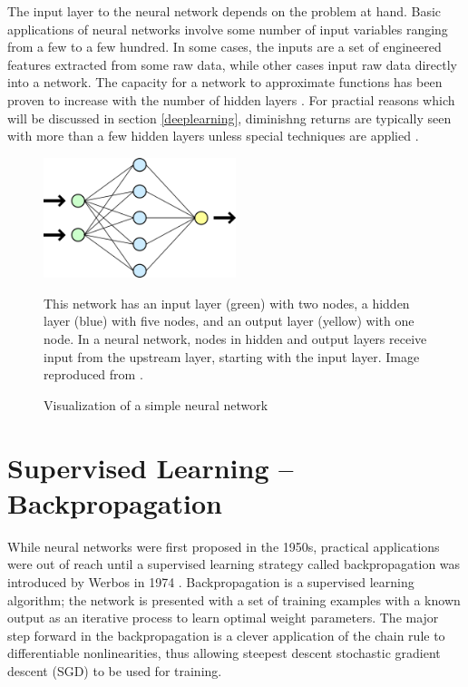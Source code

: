 The input layer to the neural network depends on the problem at hand.  Basic applications of neural networks involve some number of input variables ranging from a few to a few hundred.  In some cases, the inputs are a set of engineered features extracted from some raw data, while other cases input raw data directly into a network.  The capacity for a network to approximate functions
has been proven to increase with the number of hidden
layers \cite{reed1999neural,lecun2015deep}.
For practial reasons which will be discussed in section \ref{deeplearning},
diminishng returns are typically seen with more than a few hidden layers unless
special techniques are applied \cite{rein1981neutrino,lecun2015deep}.


\begin{figure}
  \begin{center}
    \includegraphics[width=0.5\textwidth]{figures/figures/basicNN.png}
  \end{center}
  \caption{Visualization of a simple neural network}{This network has an input
  layer (green) with two nodes, a hidden layer (blue) with five nodes, and an
  output layer (yellow) with one node.
  In a neural network, nodes in hidden and output layers receive input from the
  upstream layer, starting with the input layer.
  Image reproduced from \cite{nnetWikiCitation}.
  }

  \label{nnet}
\end{figure}


\section{Supervised Learning -- Backpropagation}
\label{backprop}

While neural networks were first proposed in the 1950s, practical applications were out of reach until a supervised learning strategy called backpropagation was introduced by Werbos in 1974 \cite{werbos1974beyond}.  Backpropagation is a supervised learning algorithm; the network is presented with a set of training examples with a known output as an iterative process to learn optimal weight parameters.  The major step forward in the backpropagation is a clever application of the chain rule to differentiable nonlinearities, thus allowing steepest descent stochastic gradient descent (SGD) to be used for training.

